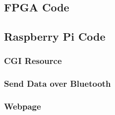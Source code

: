 \documentclass[12pt]{article}
\begin{document}
\subsection{FPGA Code}
\label{sec:fpgacode}


\subsection{Raspberry Pi Code}
\label{sec:pi}

\subsubsection{CGI Resource}


\subsubsection{Send Data over Bluetooth}


\subsubsection{Webpage}
\label{sec:webcode}

\end{document}
